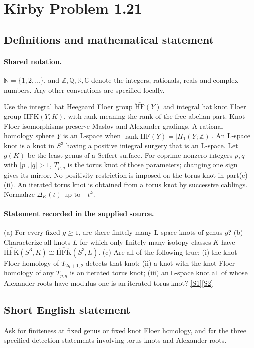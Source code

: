 \documentclass[11pt]{article}
\newcommand{\sref}[2]{\hyperlink{source:#1:#2}{[S#2]}}
\begin{document}
\section{Kirby Problem 1.21}\label{statement}

\subsection{Definitions and mathematical statement}

\paragraph{Shared notation.}$\mathbb N=\{1,2,\ldots\}$, and $\mathbb Z,\mathbb Q,\mathbb R,\mathbb C$ denote the integers, rationals, reals and complex numbers. Any other conventions are specified locally.


Use the integral hat Heegaard Floer group $\widehat{\mathrm{HF}}(Y)$ and integral hat knot Floer group $\widehat{\mathrm{HFK}}(Y,K)$, with rank meaning the rank of the free abelian part. Knot Floer isomorphisms preserve Maslov and Alexander gradings. A rational homology sphere $Y$ is an L-space when $\operatorname{rank}\widehat{\mathrm{HF}}(Y)=|H_1(Y;\mathbb Z)|$. An L-space knot is a knot in $S^3$ having a positive integral surgery that is an L-space. Let $g(K)$ be the least genus of a Seifert surface. For coprime nonzero integers $p,q$ with $|p|,|q|>1$, $T_{p,q}$ is the torus knot of those parameters; changing one sign gives its mirror. No positivity restriction is imposed on the torus knot in part(c)(ii). An iterated torus knot is obtained from a torus knot by successive cablings. Normalize $\Delta_K(t)$ up to $\pm t^k$.
\paragraph{Statement recorded in the supplied source.}
(a) For every fixed $g\geq1$, are there finitely many L-space knots of genus $g$? (b) Characterize all knots $L$ for which only finitely many isotopy classes $K$ have $\widehat{\mathrm{HFK}}(S^3,K)\cong\widehat{\mathrm{HFK}}(S^3,L)$. (c) Are all of the following true: (i) the knot Floer homology of $T_{2g+1,2}$ detects that knot; (ii) a knot with the knot Floer homology of any $T_{p,q}$ is an iterated torus knot; (iii) an L-space knot all of whose Alexander roots have modulus one is an iterated torus knot? \sref{statement}{1}\sref{statement}{2}
\subsection{Short English statement}
Ask for finiteness at fixed genus or fixed knot Floer homology, and for the three specified detection statements involving torus knots and Alexander roots.
\end{document}
